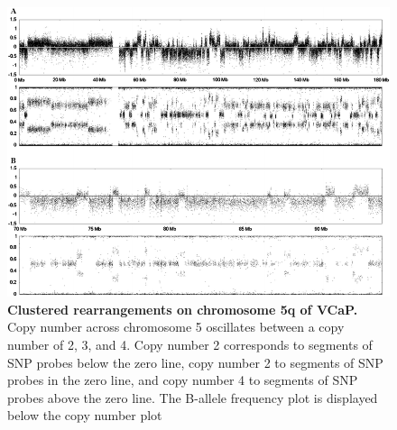 \begin{figure}
    \includegraphics[width=\textwidth]{chapters/images/vcap/gnuplots.png}
    \caption{\textbf{Clustered rearrangements on chromosome 5q of VCaP.} Copy number across chromosome 5 oscillates between a copy number of 2, 3, and 4.
Copy number 2 corresponds to segments of SNP probes below the zero line, copy number 2 to segments of SNP probes in the zero line, and copy number
4 to segments of SNP probes above the zero line. The B-allele frequency plot is displayed below the copy number plot}\label{fig:vcap-gnuplot}
\end{figure}

